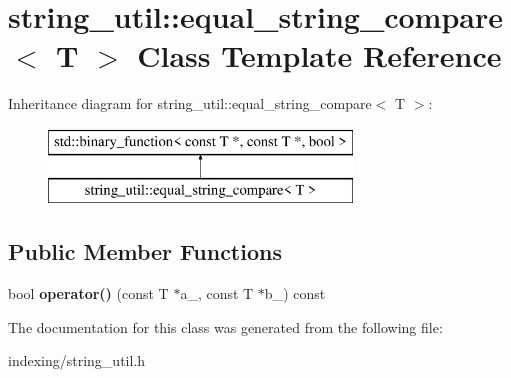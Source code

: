 \hypertarget{classstring__util_1_1equal__string__compare}{\section{string\-\_\-util\-:\-:equal\-\_\-string\-\_\-compare$<$ T $>$ Class Template Reference}
\label{classstring__util_1_1equal__string__compare}
}
Inheritance diagram for string\-\_\-util\-:\-:equal\-\_\-string\-\_\-compare$<$ T $>$\-:\begin{figure}[H]
\begin{center}
\leavevmode
\includegraphics[height=2.000000cm]{classstring__util_1_1equal__string__compare}
\end{center}
\end{figure}
\subsection*{Public Member Functions}
\begin{DoxyCompactItemize}
\item 
\hypertarget{classstring__util_1_1equal__string__compare_aedfb40c0515b97043369af03da1d72ed}{bool {\bfseries operator()} (const T $\ast$a\-\_\-, const T $\ast$b\-\_\-) const }\label{classstring__util_1_1equal__string__compare_aedfb40c0515b97043369af03da1d72ed}

\end{DoxyCompactItemize}


The documentation for this class was generated from the following file\-:\begin{DoxyCompactItemize}
\item 
indexing/string\-\_\-util.\-h\end{DoxyCompactItemize}

